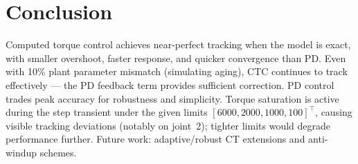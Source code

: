 \documentclass[12pt,a4paper]{article}
\begin{document}
\section{Conclusion}

Computed torque control achieves near-perfect tracking when the model is exact, with smaller overshoot, faster response, and quicker convergence than PD. Even with 10\% plant parameter mismatch (simulating aging), CTC continues to track effectively --- the PD feedback term provides sufficient correction. PD control trades peak accuracy for robustness and simplicity. Torque saturation is active during the step transient under the given limits $[6000,2000,1000,100]^\top$, causing visible tracking deviations (notably on joint~2); tighter limits would degrade performance further. Future work: adaptive/robust CT extensions and anti-windup schemes.
\end{document}
